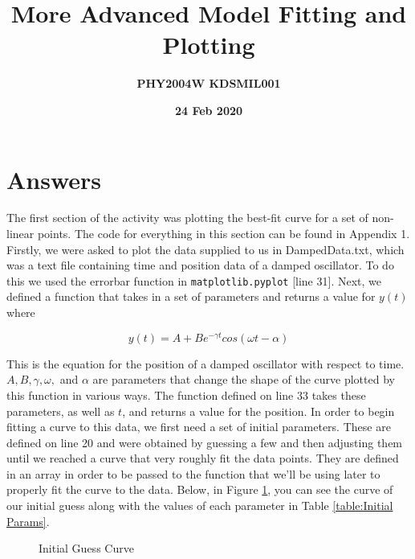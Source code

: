 \documentclass[12pt]{article}
\title{More Advanced Model Fitting and Plotting}
\author{\textbf{PHY2004W \hspace{8cm} KDSMIL001}}
\date{\textbf{24 Feb 2020}}
\begin{document}
    \begin{titlepage}
        \maketitle
        \tableofcontents
    \end{titlepage}

    \section{Answers}
    The first section of the activity was plotting the best-fit curve for a set of non-linear 
    points. The code for everything in this section can be found in Appendix 1. 
    Firstly, we were asked to plot the data supplied to us in DampedData.txt, which was a text 
    file containing time and position data of a damped oscillator. To do this we used the errorbar 
    function in \texttt{matplotlib.pyplot} [line 31]. Next, we defined a function that takes in 
    a set of parameters and returns a value for $y(t)$ where

    \begin{equation}
        y(t) = A+Be^{-\gamma t}cos(\omega t-\alpha)
    \end{equation}
    
    \noindent
    This is the equation for the position of a damped oscillator with respect to time. $A, B, 
    \gamma, \omega,$ and $\alpha$ are parameters that change the shape of the curve plotted 
    by this function in various ways. The function defined on line 33 takes these parameters, 
    as well as $t$, and returns a value for the position. \newline
    In order to begin fitting a curve to this data, we first need a set of initial parameters. 
    These are defined on line 20 and were obtained by guessing a few and then adjusting them 
    until we reached a curve that very roughly fit the data points. They are defined in an array 
    in order to be passed to the function that we'll be using later to properly fit the curve 
    to the data. Below, in Figure \ref{fig:Initial Guess}, you can see the curve of our initial 
    guess along with the values of each parameter in Table \ref{table:Initial Params}.
    
    \begin{figure}[H]
        \begin{center}
           \scalebox{.8}{}
           \caption{Initial Guess Curve}
           \label{fig:Initial Guess}
        \end{center}
    \end{figure}
\end{document}
